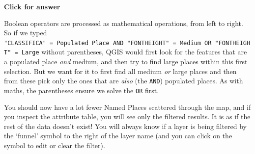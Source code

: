 \documentclass[
  letterpaper,
  DIV=11,
  numbers=noendperiod]{scrreprt}
\begin{document}
\begin{tcolorbox}[enhanced jigsaw, toprule=.15mm, breakable, left=2mm, colframe=quarto-callout-important-color-frame, colback=white, arc=.35mm, leftrule=.75mm, opacityback=0, rightrule=.15mm, bottomrule=.15mm]

\vspace{-3mm}\textbf{Click for answer}\vspace{3mm}

Boolean operators are processed as mathematical operations, from left to
right. So if we typed
\texttt{"CLASSIFICA"\ =\ \textquotesingle{}Populated\ Place\textquotesingle{}\ AND\ "FONTHEIGHT"\ =\ \textquotesingle{}Medium\textquotesingle{}\ OR\ "FONTHEIGHT"\ =\ \textquotesingle{}Large\textquotesingle{}}
without parentheses, QGIS would first look for the features that are a
populated place \emph{and} medium, and then try to find large places
within this first selection. But we want for it to first find all medium
\emph{or} large places and then from these pick only the ones that are
\emph{also} (the \texttt{AND}) populated places. As with maths, the
parentheses ensure we solve the \texttt{OR} first.

\end{tcolorbox}

You should now have a lot fewer Named Places scattered through the map,
and if you inspect the attribute table, you will see only the filtered
results. It is as if the rest of the data doesn't exist! You will always
know if a layer is being filtered by the `funnel' symbol to the right of
the layer name (and you can click on the symbol to edit or clear the
filter).
\end{document}
